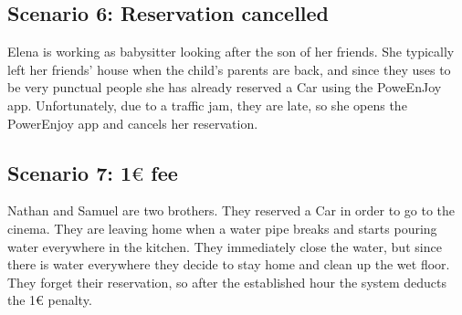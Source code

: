 \subsection{Scenario 6: Reservation cancelled}
Elena is working as babysitter looking after the son of her friends. She typically left her friends' house when the child's parents are back, and since they uses to be very punctual people she has already reserved a Car using the PoweEnJoy app. Unfortunately, due to a traffic jam, they are late, so she opens the PowerEnjoy app and cancels her reservation.

\subsection{Scenario 7: 1$\euro$ fee}
Nathan and Samuel are two brothers. They reserved a Car in order to go to the cinema. They are leaving home when a water pipe breaks and starts pouring water everywhere in the kitchen. They immediately close the water, but since there is water everywhere they decide to stay home and clean up the wet floor. They forget their reservation, so after the established hour the system deducts the 1$\euro$ penalty.